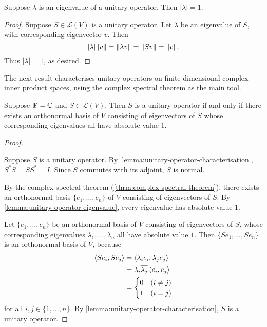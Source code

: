 \begin{lemma}\label{lemma:unitary-operator-eigenvalue}
Suppose $\lambda$ is an eigenvalue of a unitary operator. Then $|\lambda|=1$.
\end{lemma}

\begin{proof}
Suppose $S\in\mathcal{L}(V)$ is a unitary operator. 
Let $\lambda$ be an eigenvalue of $S$, with corresponding eigenvector $v$. 
Then
\[|\lambda|\norm{v}=\norm{\lambda v}=\norm{Sv}=\norm{v}.\]
Thus $|\lambda|=1$, as desired.
\end{proof}

The next result characterises unitary operators on finite-dimensional complex inner product spaces, using the complex spectral theorem as the main tool.

\begin{lemma}
Suppose $\mathbf F=\mathbb C$ and $S\in\mathcal{L}(V)$. Then $S$ is a unitary operator if and only if there exists an orthonormal basis of $V$ consisting of eigenvectors of $S$ whose corresponding eigenvalues all have absolute value $1$.
\end{lemma}

\begin{proof} \

\forward Suppose $S$ is a unitary operator. By \ref{lemma:unitary-operator-characterisation}, $S^*S=SS^*=I$. Since $S$ commutes with its adjoint, $S$ is normal.

By the complex spectral theorem (\ref{thrm:complex-spectral-theorem}), there exists an orthonormal basis $\{e_1,\dots,e_n\}$ of $V$ consisting of eigenvectors of $S$.
By \ref{lemma:unitary-operator-eigenvalue}, every eigenvalue has absolute value $1$.

\backward Let $\{e_1,\dots,e_n\}$ be an orthonormal basis of $V$ consisting of eigenvectors of $S$, whose corresponding eigenvalues $\lambda_1,\dots,\lambda_n$ all have absolute value $1$.
Then $\{Se_1,\dots,Se_n\}$ is an orthonormal basis of $V$, because
\begin{align*}
\left\langle Se_i,Se_j\right\rangle
&=\left\langle\lambda_ie_i,\lambda_je_j\right\rangle\\
&=\lambda_i\overline{\lambda_j}\left\langle e_i,e_j\right\rangle\\
&=\begin{cases}
0&(i\neq j)\\
1&(i=j)
\end{cases}
\end{align*}
for all $i,j\in\{1,\dots,n\}$. By \ref{lemma:unitary-operator-characterisation}, $S$ is a unitary operator.
\end{proof}
\pagebreak

